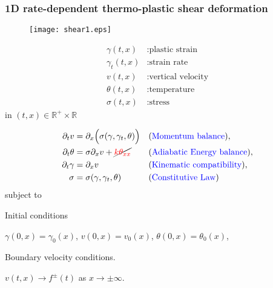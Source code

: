 \documentclass{beamer}
\def\red{\color{red}}
\def\blue{\color{blue}}
\begin{document}
\begin{frame}
\frametitle{1D rate-dependent thermo-plastic shear deformation}
    \begin{minipage}{0.31\linewidth}
    \begin{figure}
    \centering
    \texttt{[image: shear1.eps]}
    \end{figure}
      {\scriptsize
    \begin{equation*} %
    \begin{aligned}
    \gamma(t,x) &: \text{plastic strain}\\
    \gamma_t(t,x) &: \text{strain rate}\\
    v(t,x) &: \text{vertical velocity}\\
    \theta(t,x) &: \text{temperature}\\
    \sigma(t,x) &: \text{stress}
    \end{aligned}
    \end{equation*}
    in $(t,x)\in \mathbb{R}^+ \times \mathbb{R}$}
    \end{minipage}
    \begin{minipage}{0.61\linewidth}
      \begin{equation*} %
        \begin{aligned}
          \partial_t v &= \partial_x\Big(\sigma(\gamma,\gamma_t,\theta)\Big) & &\text{({\blue Momentum balance})}, \\
          \partial_t \theta &= \sigma\partial_x v + \cancel{\red k\theta_{xx}} & &\text{({\blue Adiabatic Energy balance})},\\
          \partial_t \gamma &= \partial_x v & &\text{({\blue Kinematic compatibility})},\\
          \sigma  &= \sigma(\gamma,\gamma_t,\theta) & &\text{({\blue Constitutive Law})}\\
        \end{aligned}
      \end{equation*}
       subject to %
      \vskip 5pt
      
      Initial conditions
      
      {\scriptsize $\gamma(0,x) = \gamma_0(x)$, $v(0,x) = v_0(x)$, $\theta(0,x) = \theta_0(x)$,} 
      
      Boundary velocity conditions.
      
      {\scriptsize $v(t,x) \rightarrow f^\pm(t)$ as $x \rightarrow \pm\infty$.}
    \end{minipage}
\end{frame}
\end{document}
